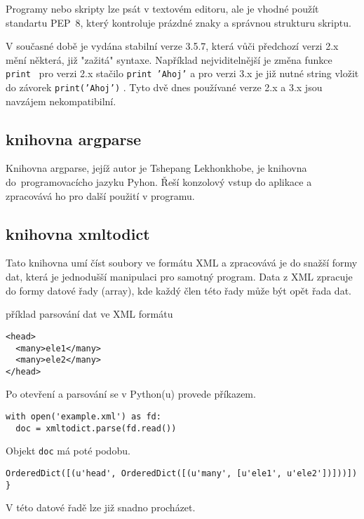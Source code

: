 Programy nebo skripty lze psát v textovém editoru, ale je vhodné použít 
standartu PEP~8, který kontroluje prázdné znaky a správnou strukturu skriptu. 

V současné době je vydána stabilní verze 3.5.7, která vůči předchozí verzi 2.x
mění některá, již "zažitá" syntaxe. Například nejviditelnější je změna funkce 
{\tt print } pro verzi 2.x stačilo  {\tt print 'Ahoj'}  a pro verzi 3.x je již
nutné string vložit do závorek  {\tt print('Ahoj')}  . Tyto dvě dnes používané
verze 2.x a 3.x jsou navzájem nekompatibilní.
\cite{python} 
\cite{wikiPython} 
  
  
\subsection{knihovna argparse}
\label{argparse} 
Knihovna argparse, jejíž autor je Tshepang Lekhonkhobe, je knihovna 
do~programovacícho jazyku Pyhon. Řeší konzolový vstup do aplikace a zpracovává 
ho pro další použití v programu.\cite{argparse}


\subsection{knihovna xmltodict}
\label{xmltodict} 
Tato knihovna umí číst soubory ve formátu XML a zpracovává je do snažší formy 
dat, která je jednodušší manipulaci pro samotný program. Data z XML zpracuje
do formy datové řady (array), kde každý člen této řady může být opět řada dat.\cite{xmltodict}

příklad parsování dat ve XML formátu

{\scriptsize
\begin{lstlisting}
<head>
  <many>ele1</many>
  <many>ele2</many>
</head>
\end{lstlisting}
}

Po otevření a parsování se v Python(u) provede příkazem.

{\scriptsize
\lstset{language=Python}
\begin{lstlisting}
with open('example.xml') as fd: 
  doc = xmltodict.parse(fd.read()) 
\end{lstlisting}
}

Objekt {\tt doc} má poté podobu.

{\scriptsize
\lstset{language=Python}
\begin{lstlisting}
OrderedDict([(u'head', OrderedDict([(u'many', [u'ele1', u'ele2'])]))]) }
\end{lstlisting}
}

V této datové řadě lze již snadno procházet. 

